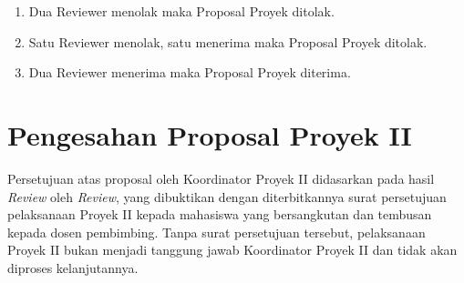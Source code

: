 \begin{enumerate}
\item Dua Reviewer	menolak	maka	Proposal	Proyek	ditolak.
\item Satu Reviewer	menolak,	satu	menerima	maka	Proposal	Proyek	ditolak.
\item Dua Reviewer	menerima	maka	Proposal	Proyek	diterima.
\end{enumerate}

\section{Pengesahan	Proposal Proyek	II}
Persetujuan	 atas	 proposal	 oleh	 Koordinator	 Proyek	 II	 didasarkan	 pada	 hasil	\textit{Review} oleh \textit{Review},	yang	dibuktikan	dengan	diterbitkannya	surat	persetujuan	pelaksanaan	Proyek	II	kepada	 mahasiswa	 yang	 bersangkutan	 dan	 tembusan	kepada	 dosen	 pembimbing.	 Tanpa	surat	 persetujuan	 tersebut,	 pelaksanaan	 Proyek	 II	 bukan	 menjadi	 tanggung	 jawab Koordinator	Proyek II dan	tidak	akan	diproses	kelanjutannya.